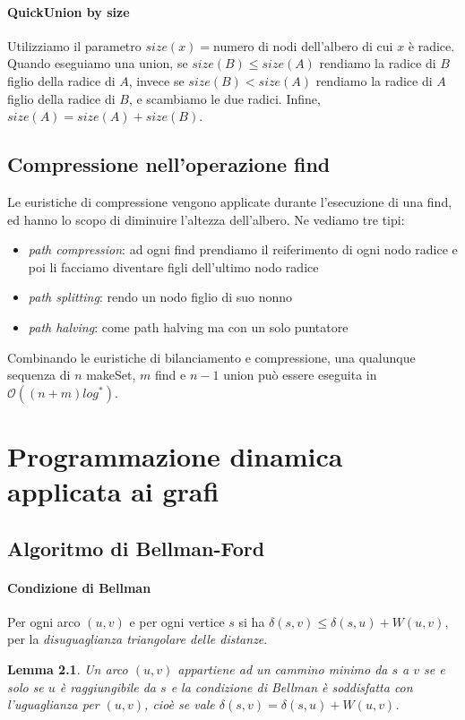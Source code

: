 \documentclass[11pt]{book}
\newtheorem*{lemma}{Lemma}
\begin{document}
\subsubsection{QuickUnion by size}
Utilizziamo il parametro $size(x)=$numero di nodi dell'albero di cui $x$ è radice.
Quando eseguiamo una union, se $size(B)\leq size(A)$ rendiamo la radice di $B$ figlio della radice di $A$, invece se 
$size(B)<size(A)$ rendiamo la radice di $A$ figlio della radice di $B$, e scambiamo le due radici. Infine, $size(A)=size(A)+size(B)$.
\section{Compressione nell'operazione find}
Le euristiche di compressione vengono applicate durante l'esecuzione di una find, ed hanno lo scopo di diminuire l'altezza
dell'albero. Ne vediamo tre tipi:
\begin{itemize}
    \item \textit{path compression}: ad ogni find prendiamo il reiferimento di ogni nodo radice e poi li facciamo diventare 
    figli dell'ultimo nodo radice
    \item \textit{path splitting}: rendo un nodo figlio di suo nonno
    \item \textit{path halving}: come path halving ma con un solo puntatore
\end{itemize}
Combinando le euristiche di bilanciamento e compressione, una qualunque sequenza di $n$ makeSet, $m$ find e $n-1$ union 
può essere eseguita in $\mathcal{O}((n+m)log^*)$.
\chapter{Programmazione dinamica applicata ai grafi}
\section{Algoritmo di Bellman-Ford}
\subsubsection{Condizione di Bellman}
Per ogni arco $(u,v)$ e per ogni vertice $s$ si ha $\delta(s,v)\leq \delta(s,u)+W(u,v)$, per la \textit{disuguaglianza 
triangolare delle distanze}.
\begin{lemma}
    Un arco $(u,v)$ appartiene ad un cammino minimo da $s$ a $v$ se e solo se $u$ è raggiungibile da $s$ e la condizione 
    di Bellman è soddisfatta con l'uguaglianza per $(u,v)$, cioè se vale $\delta(s,v)=\delta(s,u)+W(u,v)$.
\end{lemma}
\end{document}
